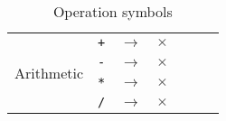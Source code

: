 \begin{table}[h!]
\begin{tabular}{ |c|c|c||c|c|c|c| }
        \multirow{4}{*}{Arithmetic} 
        & \texttt{+}
        & $\rightarrow$ 
        & $\times$
        & 
        &  
        &  
        \\
        
         
        & \texttt{-}
        & $\rightarrow$ 
        & $\times$ 
        & 
        &  
        &  
        \\
         
        & \texttt{*} 
        & $\rightarrow$ 
        & $\times$
        & 
        & 
        & 
        \\
         
        & \texttt{/}
        & $\rightarrow$ 
        & $\times$
        & 
        & 
        & 
        \\\hline
    \end{tabular}
    \caption{Operation symbols}
    \label{table:operatorsymbols}
\end{table}